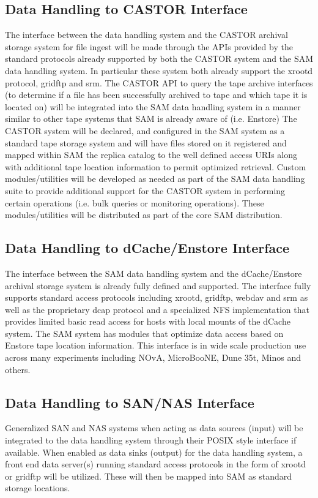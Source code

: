 \documentclass[pdftex,12pt,letter]{article}
\begin{document}
\subsection{Data Handling to CASTOR Interface}
The interface between the data handling system and the CASTOR archival storage system for file ingest will be made through the APIs provided by the standard protocols already supported by both the CASTOR system and the SAM data handling system.  In particular these system both already support the xrootd protocol, gridftp and srm.  The CASTOR API to query the tape archive interfaces (to determine if a file has been successfully archived to tape and which tape it is located on) will be integrated into the SAM data handling system in a manner similar to other tape systems that SAM is already aware of (i.e. Enstore)   The CASTOR system will be declared, and configured in the SAM system as a standard tape storage system and will have files stored on it registered and mapped within SAM the replica catalog to the well defined access URIs along with additional tape location information to permit optimized retrieval.  Custom modules/utilities will be developed as needed as part of the SAM data handling suite to provide additional support for the CASTOR system in performing certain operations (i.e. bulk queries or monitoring operations).  These modules/utilities will be distributed as part of the core SAM distribution.

\subsection{Data Handling to dCache/Enstore Interface}
The interface between the SAM data handling system and the dCache/Enstore archival storage system is already fully defined and supported.  The interface fully supports standard access protocols including xrootd, gridftp, webdav and srm as well as the proprietary dcap protocol and a specialized NFS implementation that provides limited basic read access for hosts with local mounts of the dCache system. The SAM system has modules that optimize data access based on Enstore tape location information.  This interface is in wide scale production use across many experiments including NOvA, MicroBooNE, Dune 35t, Minos and others.

\subsection{Data Handling to SAN/NAS Interface}
Generalized SAN and NAS systems when acting as data sources (input) will be integrated to the data handling system through their POSIX style interface if available.  When enabled as data sinks (output) for the data handling system, a front end data server(s) running standard access protocols in the form of xrootd or gridftp will be utilized.  These will then be mapped into SAM as standard storage locations.
  
\end{document}
